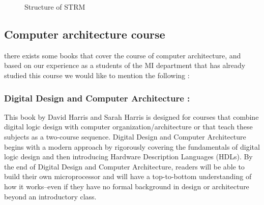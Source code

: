 \begin{figure} [h!]%
 	\vspace*{13pt}
 	\vspace*{13pt}               
 	\caption{Structure of STRM} 
 	\label{fig:STRM}
 \end{figure} 

 \subsection{Computer architecture course}
 there exists some books that cover the course of computer architecture, and based on our experience as a students of the MI department that has already studied this course 
 we would like to mention the following :
 \subsubsection{Digital Design and Computer Architecture :}
This book by David Harris and Sarah Harris is designed for courses that combine digital logic design with computer organization/architecture or that teach these subjects
as a two-course sequence. Digital Design and Computer Architecture begins with a modern approach by rigorously covering the fundamentals
of digital logic design and then introducing Hardware Description Languages (HDLs). By the end of Digital Design and Computer Architecture,
readers will be able to build their own microprocessor and will have a top-to-bottom understanding of how it works--even if they have no formal background
in design or architecture beyond an introductory class. \cite{harris2010digital}

